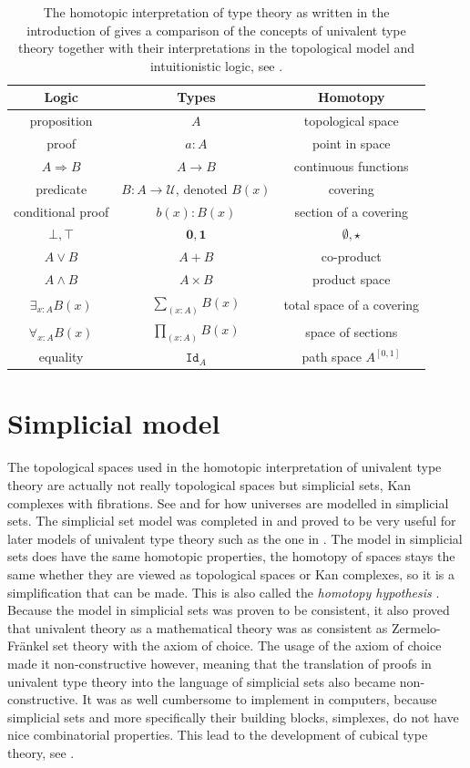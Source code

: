 \documentclass[12pt,a4paper,twoside,xetex]{book} %
\newcommand{\keyword}[1]{\emph{#1}\index{#1}}
\newcommand{\op}[1]{\mathtt{#1}}
\begin{document}
\begin{table}\label{tab:The-homotopic-interpretation}
\centering
\begin{tabular}{|c|c|c|}
\hline 
\textbf{Logic} & \textbf{Types} & \textbf{Homotopy}\tabularnewline
\hline 
proposition & $A$  & topological space\tabularnewline
proof & $a:A$ & point in space\tabularnewline 
$A\Rightarrow B$ & $A\rightarrow B$ & continuous functions\tabularnewline
predicate & $B:A\rightarrow\mathcal{U}$, denoted $B\left(x\right)$ & 
covering\tabularnewline
conditional proof & $b\left(x\right):B\left(x\right)$ & section of a 
covering\tabularnewline 
$\bot,\top$ & $\boldsymbol{0},\boldsymbol{1}$ & $\emptyset,\star$\tabularnewline
$A\vee B$ & $A+B$ & co-product\tabularnewline
$A\wedge B$ & $A\times B$ & product space\tabularnewline
$\exists_{x:A}B\left(x\right)$ & $\sum_{\left(x:A\right)}B\left(x\right)$ & 
total space of a covering\tabularnewline
$\forall_{x:A}B\left(x\right)$ & $\prod_{\left(x:A\right)}B\left(x\right)$ & 
space of sections\tabularnewline
 equality & $\op{Id}_{A}$ & path space $A^{[0,1]}$\tabularnewline
\hline 
\end{tabular}
\caption{The homotopic interpretation of type theory as written in the 
introduction of \cite{Voevodsky2013} gives a comparison of the concepts of 
univalent type theory together with their interpretations in the topological 
model and intuitionistic logic, see .}
\end{table}


\section{Simplicial model}\label{simpmod}

The topological spaces used in the homotopic interpretation of univalent type 
theory are actually not really topological spaces but simplicial 
sets, Kan complexes with fibrations. See \cite{Streicher2006} and 
\cite{Voevodsky2009} for how universes are modelled in simplicial sets. The 
simplicial set model was completed in \cite{Kapulkin2012} and proved to be very 
useful for later models of univalent type theory such as the one in 
\cite{Cohen2016}. The model in simplicial sets does have the same 
homotopic properties, the homotopy of spaces stays the same whether they are viewed 
as topological spaces or Kan complexes, so it is a simplification that can be 
made. This is also called the \keyword{homotopy hypothesis} 
\cite{Schreiber2018a}. Because the model in simplicial sets was proven to be 
consistent, it also proved that univalent theory as a mathematical theory was as 
consistent as Zermelo-Fr\"ankel set theory with the axiom of choice. The usage 
of the axiom of choice made it non-constructive however, meaning that the 
translation of proofs in univalent type theory into the language of simplicial 
sets also became non-constructive. It was as well cumbersome to implement in 
computers, because simplicial sets and more specifically their building blocks, 
simplexes, do not have nice combinatorial properties. This lead to the 
development of cubical type theory, see .
\end{document}
